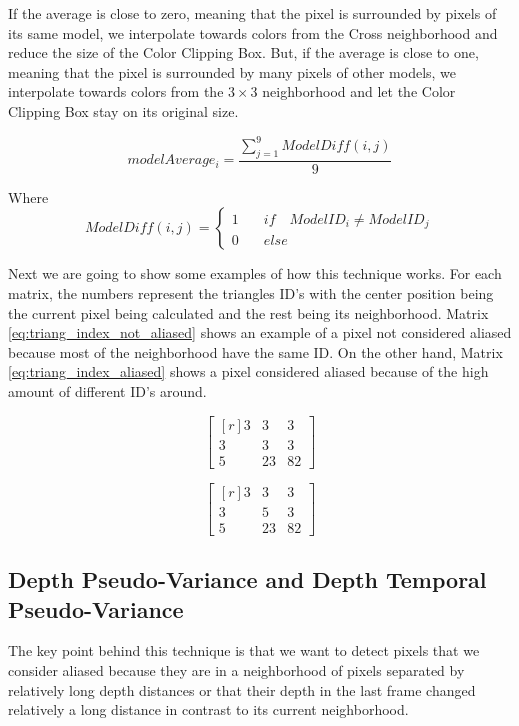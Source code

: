 \documentclass{cslthse-msc}
\begin{document}
If the average is close to zero, meaning that the pixel is surrounded by pixels of its same model, we interpolate towards colors from the Cross neighborhood and reduce the size of the Color Clipping Box. But, if the average is close to one, meaning that the pixel is surrounded by many pixels of other models, we interpolate towards colors from the $3\times 3$ neighborhood and let the Color Clipping Box stay on its original size.

\begin{equation}\label{eq:model_index_acc}
modelAverage_i = \frac{\sum\limits_{j=1}^{9} ModelDiff(i,j)}{9} 
\end{equation}

Where
\begin{equation*}
ModelDiff(i,j) = \left\lbrace \begin{split}1\quad & if\quad ModelID_i \neq ModelID_j \\ 0\quad & else\end{split} \right.
\end{equation*}

Next we are going to show some examples of how this technique works. For each matrix, the numbers represent the triangles ID's with the center position being the current pixel being calculated and the rest being its neighborhood. Matrix \ref{eq:triang_index_not_aliased} shows an example of a pixel not considered aliased because most of the neighborhood have the same ID. On the other hand, Matrix \ref{eq:triang_index_aliased} shows a pixel considered aliased because of the high amount of different ID's around.

\begin{equation}
\begin{bmatrix*}[r]\label{eq:triang_index_not_aliased}
3 &  3 & 3 \\
3 &  3 & 3 \\
5 &  23 & 82
\end{bmatrix*}
\end{equation}

\begin{equation}
\begin{bmatrix*}[r]\label{eq:triang_index_aliased}
3 &  3 & 3 \\
3 &  5 & 3 \\
5 &  23 & 82
\end{bmatrix*}
\end{equation}

\subsection{Depth Pseudo-Variance and Depth Temporal Pseudo-Variance}
The key point behind this technique is that we want to detect pixels that we consider aliased because they are in a neighborhood of pixels separated by relatively long depth distances or that their depth in the last frame changed relatively a long distance in contrast to its current neighborhood.
\end{document}
